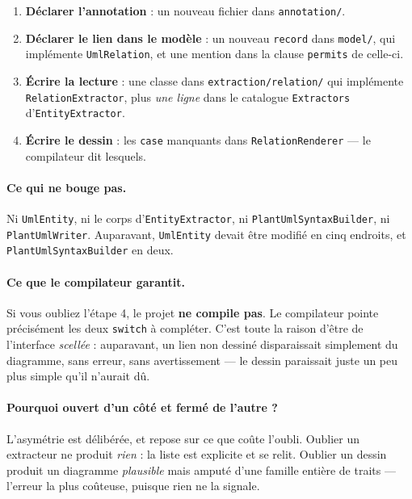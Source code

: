 \documentclass[12pt, a4paper]{article}
\begin{document}
\begin{enumerate}
  \item \textbf{Déclarer l'annotation} : un nouveau fichier dans \texttt{annotation/}.
  \item \textbf{Déclarer le lien dans le modèle} : un nouveau \texttt{record} dans
        \texttt{model/}, qui implémente \texttt{UmlRelation}, et une mention dans la clause
        \texttt{permits} de celle-ci.
  \item \textbf{Écrire la lecture} : une classe dans \texttt{extraction/relation/} qui implémente
        \texttt{RelationExtractor}, plus \emph{une ligne} dans le catalogue
        \texttt{Extractors} d'\texttt{EntityExtractor}.
  \item \textbf{Écrire le dessin} : les \texttt{case} manquants dans \texttt{RelationRenderer} —
        le compilateur dit lesquels.
\end{enumerate}

\paragraph{Ce qui ne bouge pas.} Ni \texttt{UmlEntity}, ni le corps d'\texttt{EntityExtractor},
ni \texttt{PlantUmlSyntaxBuilder}, ni \texttt{PlantUmlWriter}. Auparavant, \texttt{UmlEntity}
devait être modifié en cinq endroits, et \texttt{PlantUmlSyntaxBuilder} en deux.

\paragraph{Ce que le compilateur garantit.} Si vous oubliez l'étape 4, le projet
\textbf{ne compile pas}. Le compilateur pointe précisément les deux \texttt{switch} à
compléter. C'est toute la raison d'être de l'interface \emph{scellée} : auparavant, un lien non
dessiné disparaissait simplement du diagramme, sans erreur, sans avertissement — le dessin
paraissait juste un peu plus simple qu'il n'aurait dû.

\paragraph{Pourquoi ouvert d'un côté et fermé de l'autre ?} L'asymétrie est délibérée, et
repose sur ce que coûte l'oubli. Oublier un extracteur ne produit \emph{rien} : la liste est
explicite et se relit. Oublier un dessin produit un diagramme \emph{plausible} mais amputé
d'une famille entière de traits — l'erreur la plus coûteuse, puisque rien ne la signale.
\end{document}
